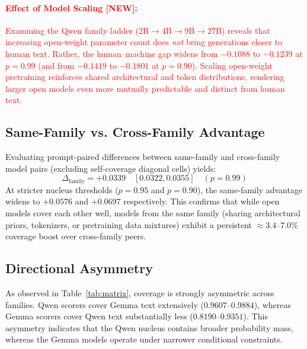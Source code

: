 \documentclass[11pt,a4paper,twocolumn]{article}
\newcommand{\diff}[1]{\textcolor{red}{#1}}
\begin{document}
\paragraph{\diff{Effect of Model Scaling [NEW]:}}
\diff{Examining the Qwen family ladder ($2\text{B} \to 4\text{B} \to 9\text{B} \to 27\text{B}$) reveals that increasing open-weight parameter count does \emph{not} bring generations closer to human text. Rather, the human--machine gap widens from $-0.1088$ to $-0.1239$ at $p=0.99$ (and from $-0.1419$ to $-0.1801$ at $p=0.90$). Scaling open-weight pretraining reinforces shared architectural and token distributions, rendering larger open models even more mutually predictable and distinct from human text.}

\subsection{Same-Family vs. Cross-Family Advantage}
Evaluating prompt-paired differences between same-family and cross-family model pairs (excluding self-coverage diagonal cells) yields:
\begin{equation*}
\Delta_{\text{family}} = +0.0339 \quad [0.0322, 0.0355] \quad (p=0.99)
\end{equation*}
At stricter nucleus thresholds ($p=0.95$ and $p=0.90$), the same-family advantage widens to $+0.0576$ and $+0.0697$ respectively. This confirms that while open models cover each other well, models from the same family (sharing architectural priors, tokenizers, or pretraining data mixtures) exhibit a persistent $\approx 3.4$--$7.0\%$ coverage boost over cross-family peers.

\subsection{Directional Asymmetry}
As observed in Table~\ref{tab:matrix}, coverage is strongly asymmetric across families. Qwen scorers cover Gemma text extensively ($0.9607$--$0.9884$), whereas Gemma scorers cover Qwen text substantially less ($0.8190$--$0.9351$). This asymmetry indicates that the Qwen nucleus contains broader probability mass, whereas the Gemma models operate under narrower conditional constraints.
\end{document}
